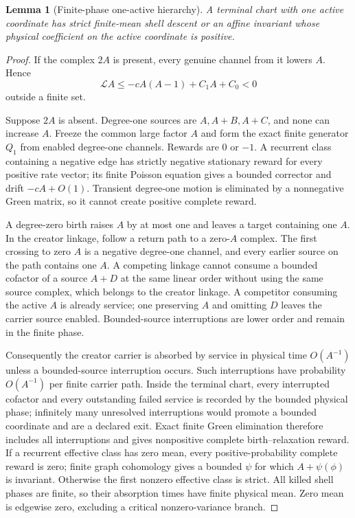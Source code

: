 \documentclass[11pt]{article}
\newtheorem{lemma}[theorem]{Lemma}
\theoremstyle{definition}\newtheorem{definition}[theorem]{Definition}
\theoremstyle{remark}\newtheorem{remark}[theorem]{Remark}
\begin{document}
\begin{lemma}[Finite-phase one-active hierarchy]\label{lem:one}
A terminal chart with one active coordinate has strict finite-mean shell descent or an affine invariant whose physical coefficient on the active coordinate is positive.
\end{lemma}

\begin{proof}
If the complex $2A$ is present, every genuine channel from it lowers $A$.  Hence
\[
 \mathcal LA\le-cA(A-1)+C_1A+C_0<0
\]
outside a finite set.

Suppose $2A$ is absent.  Degree-one sources are $A,A+B,A+C$, and none can increase $A$.  Freeze the common large factor $A$ and form the exact finite generator $Q_1$ from enabled degree-one channels.  Rewards are $0$ or $-1$.  A recurrent class containing a negative edge has strictly negative stationary reward for every positive rate vector; its finite Poisson equation gives a bounded corrector and drift $-cA+O(1)$.  Transient degree-one motion is eliminated by a nonnegative Green matrix, so it cannot create positive complete reward.

A degree-zero birth raises $A$ by at most one and leaves a target containing one $A$.  In the creator linkage, follow a return path to a zero-$A$ complex.  The first crossing to zero $A$ is a negative degree-one channel, and every earlier source on the path contains one $A$.  A competing linkage cannot consume a bounded cofactor of a source $A+D$ at the same linear order without using the same source complex, which belongs to the creator linkage.  A competitor consuming the active $A$ is already service; one preserving $A$ and omitting $D$ leaves the carrier source enabled.  Bounded-source interruptions are lower order and remain in the finite phase.

Consequently the creator carrier is absorbed by service in physical time $O(A^{-1})$ unless a bounded-source interruption occurs.  Such interruptions have probability $O(A^{-1})$ per finite carrier path.  Inside the terminal chart, every interrupted cofactor and every outstanding failed service is recorded by the bounded physical phase; infinitely many unresolved interruptions would promote a bounded coordinate and are a declared exit.  Exact finite Green elimination therefore includes all interruptions and gives nonpositive complete birth--relaxation reward.  If a recurrent effective class has zero mean, every positive-probability complete reward is zero; finite graph cohomology gives a bounded $\psi$ for which $A+\psi(\phi)$ is invariant.  Otherwise the first nonzero effective class is strict.  All killed shell phases are finite, so their absorption times have finite physical mean.  Zero mean is edgewise zero, excluding a critical nonzero-variance branch.
\end{proof}
\end{document}
